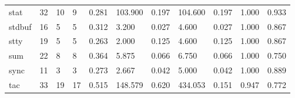\begin{longtable}{lp{1.8cm}p{1.8cm}p{1.8cm}p{1.8cm}p{1.8cm}p{1.8cm}p{1.8cm}p{1.8cm}p{1.8cm}p{1.8cm}}
stat      &                           32 &                 10 &                                 9 &                                      0.281 &                                103.900 &                                        0.197 &                           104.600 &                                   0.197 &                              1.000 &                                              0.933 \\
stdbuf    &                           16 &                  5 &                                 5 &                                      0.312 &                                  3.200 &                                        0.027 &                             4.600 &                                   0.027 &                              1.000 &                                              0.867 \\
stty      &                           19 &                  5 &                                 5 &                                      0.263 &                                  2.000 &                                        0.125 &                             4.600 &                                   0.125 &                              1.000 &                                              0.867 \\
sum       &                           22 &                  8 &                                 8 &                                      0.364 &                                  5.875 &                                        0.066 &                             6.750 &                                   0.066 &                              1.000 &                                              0.750 \\
sync      &                           11 &                  3 &                                 3 &                                      0.273 &                                  2.667 &                                        0.042 &                             5.000 &                                   0.042 &                              1.000 &                                              0.889 \\
tac       &                           33 &                 19 &                                17 &                                      0.515 &                                148.579 &                                        0.620 &                           434.053 &                                   0.151 &                              0.947 &                                              0.772 \\

\end{longtable}
